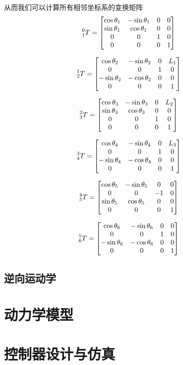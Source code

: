 \documentclass{ctexart}
\begin{document}
从而我们可以计算所有相邻坐标系的变换矩阵
\[
    \prescript{0}{1}{T} =
    \begin{bmatrix}
        \cos \theta_1 & - \sin \theta_1 & 0 & 0 \\
        \sin \theta_1 & \cos \theta_1 & 0 & 0 \\
        0 & 0 & 1 & 0 \\
        0 & 0 & 0 & 1
    \end{bmatrix}
\]

\[
    \prescript{1}{2}{T} =
    \begin{bmatrix}
        \cos \theta_2 & - \sin \theta_2 & 0 & L_1 \\
        0 & 0 & 1 & 0 \\
        -\sin \theta_2 & - \cos \theta_2 & 0 & 0 \\
        0 & 0 & 0 & 1
    \end{bmatrix}
\]

\[
    \prescript{2}{3}{T} = 
    \begin{bmatrix}
        \cos \theta_3 & - \sin \theta_3 & 0 & L_2 \\
        \sin \theta_3 & \cos \theta_3 & 0 & 0 \\
        0 & 0 & 1 & 0 \\
        0 & 0 & 0 & 1
    \end{bmatrix}
\]

\[
    \prescript{3}{4}{T} =
    \begin{bmatrix}
        \cos \theta_4 & - \sin \theta_4 & 0 & L_3 \\
        0 & 0 & 1 & 0 \\
        -\sin \theta_4 & - \cos \theta_4 & 0 & 0 \\
        0 & 0 & 0 & 1
    \end{bmatrix}
\]

\[
    \prescript{4}{5}{T} =
    \begin{bmatrix}
        \cos \theta_5 & - \sin \theta_5 & 0 & 0 \\
        0 & 0 & -1 & 0 \\
        \sin \theta_5 & \cos \theta_5 & 0 & 0 \\
        0 & 0 & 0 & 1
    \end{bmatrix}
\]

\[
    \prescript{5}{6}{T} =
    \begin{bmatrix}
        \cos \theta_6 & - \sin \theta_6 & 0 & 0 \\
        0 & 0 & 1 & 0 \\
        -\sin \theta_6 & - \cos \theta_6 & 0 & 0 \\
        0 & 0 & 0 & 1
    \end{bmatrix}
\]


\subsection{逆向运动学}

\section{动力学模型}

\section{控制器设计与仿真}
\end{document}
